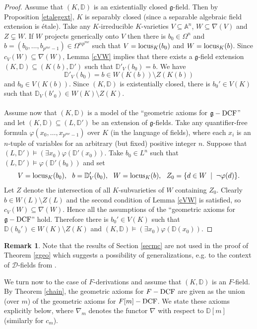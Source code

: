 \documentclass[10pt]{amsart}
\theoremstyle{definition}
\newtheorem{remark}[theorem]{Remark}
\begin{document}
\begin{proof}
 Assume that $(K,\mathbb{D})$ is an existentially closed $\mathfrak{g}$-field. Then by Proposition \ref{etalegext}, $K$ is separably closed (since a separable algebraic field extension is \'{e}tale). Take any $K$-irreducible $K$-varieties $V\subseteq \mathbb{A}^n$, $W\subseteq \nabla(V)$ and
 $Z\subsetneq W$. If $W$ projects generically onto $V$ then there is $b_0\in\Omega^n$ and
 $b=(b_0,\ldots,b_{p^{me}-1})\in\Omega^{np^{me}}$ such that $V=\operatorname{locus}_K(b_0)$ and $W=\operatorname{locus}_K(b)$. Since $c_V(W)\subseteq \nabla(W)$,
 Lemma \ref{cVW} implies that there exists a $\mathfrak{g}$-field extension $(K,\mathbb{D})\subseteq (K(b),\mathbb{D}')$
 such that $\mathbb{D}'_V(b_0)=b$. We have
 $$\mathbb{D}'_V(b_0)=b\in W(K(b))\setminus Z(K(b))$$
 and $b_0\in V(K(b))$. Since
 $(K,\mathbb{D})$ is existentially closed, there is $b_0'\in V(K)$ such that
 $\mathbb{D}_V(b'_0)\in W(K)\setminus Z(K)$.
 \\
 \\
Assume now that $(K,\mathbb{D})$ is a model of the ``geometric axioms for $\mathfrak{g}-\operatorname{DCF}$'' and let $(K,\mathbb{D})\subseteq (L,\mathbb{D}')$ be an extension of $\mathfrak{g}$-fields. Take any quantifier-free formula $\varphi(x_0,\ldots,x_{p^{me}-1})$ over $K$ (in the language of fields), where each $x_i$ is an $n$-tuple of variables for an arbitrary (but fixed) positive integer $n$. Suppose that $(L,\mathbb{D}')\models (\exists x_0)\varphi(\mathbb{D}'(x_0))$. Take $b_0\in L^n$ such that $(L,\mathbb{D}')\models\varphi(\mathbb{D}'(b_0))$
 and set
 $$V=\locus_K(b_0),\ \ b=\mathbb{D}_V'(b_0),\ \ W=\locus_K(b),\ \ Z_0=\lbrace d\in W\;\;|\;\; \neg\varphi(d)\rbrace.$$
Let $Z$ denote the intersection of all $K$-subvarieties of $W$ containing $Z_0$. Clearly $b\in W(L)\setminus Z(L)$ and
the second condition of Lemma \ref{cVW} is satisfied, so $c_{V}(W)\subseteq \nabla(W)$. Hence all the assumptions of the ``geometric axioms for $\mathfrak{g}-\operatorname{DCF}$'' hold.
 Therefore there is $b_0'\in V(K)$ such that $\mathbb{D}(b_0')\in W(K)\setminus Z(K)$ and $(K,\mathbb{D})\models (\exists x_0)\varphi(\mathbb{D}(x_0))$.
\end{proof}
\begin{remark}\label{gremark}
Note that the results of Section \ref{secmc} are not used in the proof of Theorem \ref{ggeo} which suggests a possibility of generalizations, e.g. to the context of $\mathcal{D}$-fields from \cite{MS}.
\end{remark}
\noindent
We turn now to the case of $F$-derivations and assume that $(K,\mathbb{D})$ is an $F$-field. By Theorem \ref{chain}, the geometric axioms for $F-\operatorname{DCF}$ are given as the union (over $m$) of the geometric axioms for $F[m]-\operatorname{DCF}$. We state these axioms explicitly below, where $\nabla_m$ denotes the functor $\nabla$ with respect to $\mathbb{D}[m]$ (similarly for $c_m$).
\end{document}
